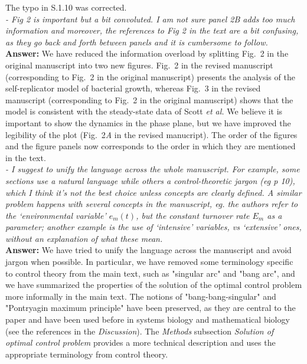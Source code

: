 \documentclass[11pt]{article}
\begin{document}
The typo in S.1.10 was corrected.\\

\textit{- Fig 2 is important but a bit convoluted. I am not sure panel 2B adds too much information and moreover, the references to Fig 2 in the text are a bit confusing, as they go back and forth between panels and it is cumbersome to follow.} \\

\noindent\textbf{Answer:} We have reduced the information overload by splitting Fig.~2 in the original manuscript into two new figures. Fig.~2 in the revised manuscript (corresponding to Fig.~2 in the original manuscript) presents the analysis of the self-replicator model of bacterial growth, whereas Fig.~3 in the revised manuscript (corresponding to Fig.~2 in the original manuscript) shows that the model is consistent with the steady-state data of Scott \textit{et al.} We believe it is important to show the dynamics in the phase plane, but we have improved the legibility of the plot (Fig.~2\textit{A} in the revised manucript). The order of the figures and the figure panels now corresponds to the order in which they are mentioned in the text.\\

\textit{- I suggest to unify the language across the whole manuscript. For example, some sections use a natural language while others a control-theoretic jargon (eg p 10), which I think it’s not the best choice unless concepts are clearly defined. A similar problem happens with several concepts in the manuscript, eg. the authors refer to the ‘environmental variable’ $e_{m}(t)$, but the constant turnover rate $E_m$ as a parameter; another example is the use of ‘intensive’ variables, vs ‘extensive’ ones, without an explanation of what these mean.} \\

\noindent\textbf{Answer:} We have tried to unify the language across the manuscript and avoid jargon when possible. In particular, we have removed some terminology specific to control theory from the main text, such as "singular arc" and "bang arc", and we have summarized the properties of the solution of the optimal control problem more informally in the main text. The notions of "bang-bang-singular" and "Pontryagin maximum principle" have been preserved, as they are central to the paper and have been used before in systems biology and mathematical biology (see the references in the \textit{Discussion}). The \textit{Methods} subsection \textit{Solution of optimal control problem} provides a more technical description and uses the appropriate terminology from control theory. 
\end{document}
